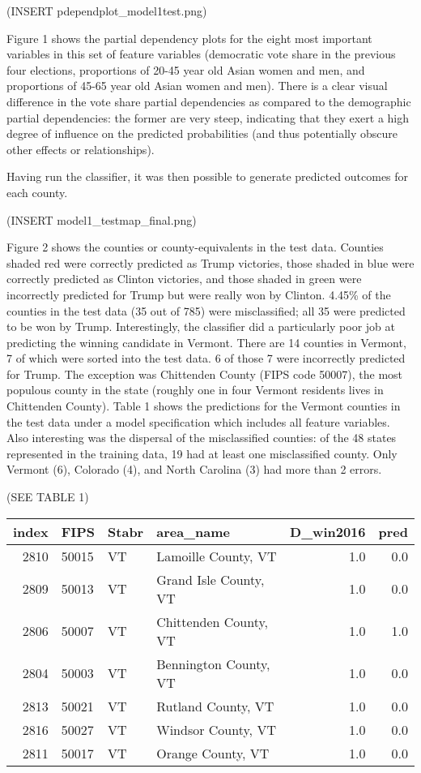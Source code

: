 \documentclass[11pt]{article}
\begin{document}
    (INSERT pdependplot\_model1test.png)

    Figure 1 shows the partial dependency plots for the eight most important
variables in this set of feature variables (democratic vote share in the
previous four elections, proportions of 20-45 year old Asian women and
men, and proportions of 45-65 year old Asian women and men). There is a
clear visual difference in the vote share partial dependencies as
compared to the demographic partial dependencies: the former are very
steep, indicating that they exert a high degree of influence on the
predicted probabilities (and thus potentially obscure other effects or
relationships).

    Having run the classifier, it was then possible to generate predicted
outcomes for each county.

    (INSERT model1\_testmap\_final.png)

    Figure 2 shows the counties or county-equivalents in the test data.
Counties shaded red were correctly predicted as Trump victories, those
shaded in blue were correctly predicted as Clinton victories, and those
shaded in green were incorrectly predicted for Trump but were really won
by Clinton. 4.45\% of the counties in the test data (35 out of 785) were
misclassified; all 35 were predicted to be won by Trump. Interestingly,
the classifier did a particularly poor job at predicting the winning
candidate in Vermont. There are 14 counties in Vermont, 7 of which were
sorted into the test data. 6 of those 7 were incorrectly predicted for
Trump. The exception was Chittenden County (FIPS code 50007), the most
populous county in the state (roughly one in four Vermont residents
lives in Chittenden County). Table 1 shows the predictions for the
Vermont counties in the test data under a model specification which
includes all feature variables. Also interesting was the dispersal of
the misclassified counties: of the 48 states represented in the training
data, 19 had at least one misclassified county. Only Vermont (6),
Colorado (4), and North Carolina (3) had more than 2 errors.

    (SEE TABLE 1)

\begin{tabular}{rlllrr}
\toprule
 index &   FIPS & Stabr &              area\_name &  D\_win2016 &  pred \\
\midrule
  2810 &  50015 &    VT &    Lamoille County, VT &        1.0 &   0.0 \\
  2809 &  50013 &    VT &  Grand Isle County, VT &        1.0 &   0.0 \\
  2806 &  50007 &    VT &  Chittenden County, VT &        1.0 &   1.0 \\
  2804 &  50003 &    VT &  Bennington County, VT &        1.0 &   0.0 \\
  2813 &  50021 &    VT &     Rutland County, VT &        1.0 &   0.0 \\
  2816 &  50027 &    VT &     Windsor County, VT &        1.0 &   0.0 \\
  2811 &  50017 &    VT &      Orange County, VT &        1.0 &   0.0 \\
\bottomrule
\end{tabular}
\end{document}
